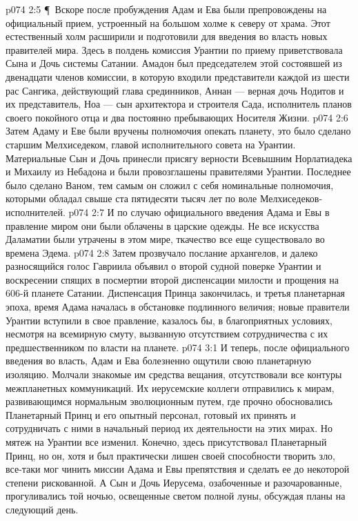 \vs p074 2:5 \P\ Вскоре после пробуждения Адам и Ева были препровождены на официальный прием, устроенный на большом холме к северу от храма. Этот естественный холм расширили и подготовили для введения во власть новых правителей мира. Здесь в полдень комиссия Урантии по приему приветствовала Сына и Дочь системы Сатании. Амадон был председателем этой состоявшей из двенадцати членов комиссии, в которую входили представители каждой из шести рас Сангика, действующий глава срединников, Аннан --- верная дочь Нодитов и их представитель, Ноа --- сын архитектора и строителя Сада, исполнитель планов своего покойного отца и два постоянно пребывающих Носителя Жизни.
\vs p074 2:6 Затем Адаму и Еве были вручены полномочия опекать планету, это было сделано старшим Мелхиседеком, главой исполнительного совета на Урантии. Материальные Сын и Дочь принесли присягу верности Всевышним Норлатиадека и Михаилу из Небадона и были провозглашены правителями Урантии. Последнее было сделано Ваном, тем самым он сложил с себя номинальные полномочия, которыми обладал свыше ста пятидесяти тысяч лет по воле Мелхиседеков\hyp{}исполнителей.
\vs p074 2:7 И по случаю официального введения Адама и Евы в правление миром они были облачены в царские одежды. Не все искусства Даламатии были утрачены в этом мире, ткачество все еще существовало во времена Эдема.
\vs p074 2:8 Затем прозвучало послание архангелов, и далеко разносящийся голос Гавриила объявил о второй судной поверке Урантии и воскресении спящих в посмертии второй диспенсации милости и прощения на 606\hyp{}й планете Сатании. Диспенсация Принца закончилась, и третья планетарная эпоха, время Адама началась в обстановке подлинного величия; новые правители Урантии вступили в свое правление, казалось бы, в благоприятных условиях, несмотря на всемирную смуту, вызванную отсутствием сотрудничества с их предшественником по власти на планете.
\vs p074 3:1 И теперь, после официального введения во власть, Адам и Ева болезненно ощутили свою планетарную изоляцию. Молчали знакомые им средства вещания, отсутствовали все контуры межпланетных коммуникаций. Их иерусемские коллеги отправились к мирам, развивающимся нормальным эволюционным путем, где прочно обосновались Планетарный Принц и его опытный персонал, готовый их принять и сотрудничать с ними в начальный период их деятельности на этих мирах. Но мятеж на Урантии все изменил. Конечно, здесь присутствовал Планетарный Принц, но он, хотя и был практически лишен своей способности творить зло, все\hyp{}таки мог чинить миссии Адама и Евы препятствия и сделать ее до некоторой степени рискованной. А Сын и Дочь Иерусема, озабоченные и разочарованные, прогуливались той ночью, освещенные светом полной луны, обсуждая планы на следующий день.
